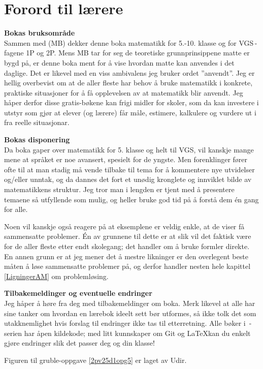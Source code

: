 



\newpage
\section*{Forord til lærere}
\textbf{Bokas bruksområde}\\
Sammen med  (MB) dekker denne boka matematikk for 5.-10. klasse og for VGS\,-\,fagene 1P og 2P. Mens MB tar for seg de teoretiske grunnprinsippene matte er bygd på, er denne boka ment for å vise hvordan matte kan anvendes i det daglige. Det er likevel med en viss ambivalens jeg bruker ordet ''anvendt''. Jeg er hellig overbevist om at de aller fleste har behov å bruke matematikk i konkrete, praktiske situasjoner for å få opplevelsen av at matematikk blir anvendt. Jeg håper derfor disse gratis-bøkene kan frigi midler for skoler, som da kan investere i utstyr som gjør at elever (og lærere) får måle, estimere, kalkulere og vurdere ut i fra reelle situasjonar.\vsk

\textbf{Bokas disponering} \\
Da boka gaper over matematikk for 5. klasse og helt til VGS, vil kanskje mange mene at språket er noe avansert, spesielt for de yngste. Men forenklinger fører ofte til at man stadig må vende tilbake til tema for å kommentere nye utvidelser og/eller unntak, og da dannes det fort et unødig kronglete og innviklet bilde av matematikkens struktur. Jeg tror man i lengden er tjent med å presentere temaene så utfyllende som mulig, og heller bruke god tid på å forstå dem én gang for alle.\vsk

Noen vil kanskje også reagere på at eksemplene er veldig enkle, at de viser få sammensatte problemer. Én av grunnene til dette er at slik vil det faktisk være for de aller fleste etter endt skolegang; det handler om å bruke formler direkte. En annen grunn er at jeg mener det å mestre likninger er den overlegent beste måten å løse sammensatte problemer på, og derfor handler nesten hele kapittel \ref{LigningerAM} om problemløsing.\vsk

\textbf{Tilbakemeldinger og eventuelle endringer} \\
Jeg håper å høre fra deg med tilbakemeldinger om boka. Merk likevel at alle har sine tanker om hvordan en lærebok ideelt sett bør utformes, så ikke tolk det som utakknemlighet hvis forslag til endringer ikke tas til etterretning. Alle bøker i \openmath\,-serien har åpen kildekode; med litt kunnskaper om Git og \LaTeX\;kan du enkelt gjøre endringer slik det passer deg og din klasse!


\newpage

Figuren til gruble-oppgave \ref{2pv25d1opg5} er laget av Udir.

